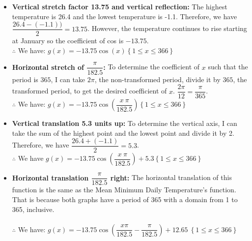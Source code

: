 \documentclass[12pt]{book}
\begin{document}
\begin{enumerate}
\begin{itemize}
  \item \textbf{Vertical stretch factor 13.75 and vertical reflection:} The highest temperature is 26.4 and the lowest temperature is -1.1. Therefore, we have $\dfrac{26.4 - (-1.1))}{2} = 13.75$. However, the temperature continues to rise starting at January so the coefficient of cos is $-13.75$.\\
  $\therefore$ We have: $g(x) = -13.75\cos(x) \left\{1\le x\le366\right\}$
  
  \item \textbf{Horizontal stretch of $\dfrac{\pi}{182.5}$:} To determine the coefficient of $x$ such that the period is $365$, I can take $2\pi$, the non-transformed period, divide it by $365$, the transformed period, to get the desired coefficient of $x$. $\dfrac{2\pi}{12} = \dfrac{\pi}{365}$.\\
  $\therefore$ We have: $g\left(x\right)=-13.75\cos\left(\dfrac{x\ \pi}{182.5}\right) \left\{1\le x\le366\right\}$
  
  \item \textbf{Vertical translation 5.3 units up:} To determine the vertical axis, I can take the sum of the highest point and the lowest point and divide it by 2. Therefore, we have $\dfrac{26.4+(-1.1)}{2} = 5.3$.\\
  $\therefore$ We have $g\left(x\right)=-13.75\cos\left(\dfrac{x\ \pi}{182.5}\right)+5.3 \left\{1\le x\le366\right\}$
  \newpage %
  \item \textbf{Horizontal translation $\dfrac{\pi}{182.5}$ right:} The horizontal translation of this function is the same as the Mean Minimum Daily Temperature's function. That is because both graphs have a period of 365 with a domain from 1 to 365, inclusive.\\\\
  $\therefore$ We have: $g\left(x\right)=-13.75\cos\left(\dfrac{x\pi}{182.5}-\dfrac{\pi}{182.5}\right)+12.65\ \left\{1\le x\le366\right\}$
\end{itemize} %


\end{enumerate}
\end{document}

